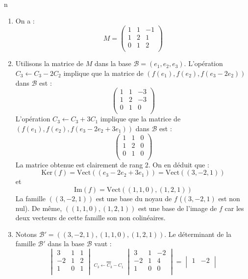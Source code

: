 n\documentclass[a4paper,10pt]{report}
\begin{document}
\corr 

\begin{enumerate}
\item On a :
$$ M  = \begin{pmatrix}
1  & 1 & - 1 \\
1  & 2 & 1  \\
0  & 1 & 2 \\
\end{pmatrix}$$
\item Utilisons la matrice de $M$ dans la base $\mathcal{B}=(e_1,e_2,e_3)$. L'opération $C_3 \leftarrow C_3-2C_2$ implique que la matrice de $(f(e_1),f(e_2),f(e_3-2e_2))$ dans $\mathcal{B}$ est :
$$ \begin{pmatrix}
1  & 1 & - 3 \\
1  & 2 & -3  \\
0  & 1 & 0 \\
\end{pmatrix}$$
L'opération $C_3 \leftarrow C_3+3C_1$ implique que la matrice de $(f(e_1),f(e_2),f(e_3-2e_2+3e_1))$ dans $\mathcal{B}$ est :
$$ \begin{pmatrix}
1  & 1 & 0 \\
1  & 2 & 0  \\
0  & 1 & 0 \\
\end{pmatrix}$$
La matrice obtenue est clairement de rang $2$. On en déduit que :
$$ \textrm{Ker}(f) = \textrm{Vect}((e_3-2e_2+3e_1)) = \textrm{Vect}((3,-2,1))$$
et 
$$ \textrm{Im}(f) = \textrm{Vect}((1,1,0),(1,2,1))$$
La famille $((3,-2,1))$ est une base du noyau de $f$ ($(3,-2,1)$ est non nul). De même, $((1,1,0),(1,2,1))$ est une base de l'image de $f$ car les deux vecteurs de cette famille son non colinéaires.
\item Notons $\mathcal{B}'=((3,-2,1),(1,1,0),(1,2,1))$. Le déterminant de la famille $\mathcal{B}'$ dans la base $\mathcal{B}$ vaut :
$$ \begin{vmatrix}
3 & 1 & 1 \\
-2 & 1 & 2\\
1& 0 & 1\\
\end{vmatrix}  \underset{C_3 \leftarrow C_3 - C_1}{=} \begin{vmatrix}
3 & 1 & -2 \\
-2 & 1 & 4\\
1& 0 & 0\\
\end{vmatrix} = \begin{vmatrix}
 1 & -2 \\

\end{vmatrix}$$
\end{enumerate}
\end{document}
